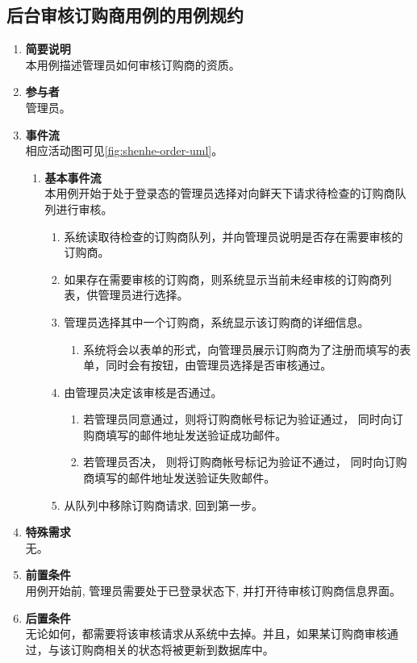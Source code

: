 \subsection{后台审核订购商用例的用例规约}

\begin{enumerate}
	\item \textbf{简要说明}  \\ 本用例描述管理员如何审核订购商的资质。
	\item \textbf{参与者} \\ 管理员。
	\item \textbf{事件流} \\ 相应活动图可见\autoref{fig:shenhe-order-uml}。
	\begin{enumerate} 
        \item \textbf{基本事件流} \\ 本用例开始于处于登录态的管理员选择对向鲜天下请求待检查的订购商队列进行审核。
        \begin{enumerate}
            \item 系统读取待检查的订购商队列，并向管理员说明是否存在需要审核的订购商。
            \item 如果存在需要审核的订购商，则系统显示当前未经审核的订购商列表，供管理员进行选择。
            \item 管理员选择其中一个订购商，系统显示该订购商的详细信息。
            \begin{enumerate}
                \item 系统将会以表单的形式，向管理员展示订购商为了注册而填写的表单，同时会有按钮，由管理员选择是否审核通过。
            \end{enumerate}
            \item 由管理员决定该审核是否通过。
            \begin{enumerate}
                \item 若管理员同意通过，则将订购商帐号标记为验证通过， 同时向订购商填写的邮件地址发送验证成功邮件。
                \item 若管理员否决， 则将订购商帐号标记为验证不通过， 同时向订购商填写的邮件地址发送验证失败邮件。
            \end{enumerate}
            \item 从队列中移除订购商请求, 回到第一步。
        \end{enumerate}
    \end{enumerate}
    \item \textbf{特殊需求} \\ 无。
    \item \textbf{前置条件} \\ 用例开始前, 管理员需要处于已登录状态下, 并打开待审核订购商信息界面。
    \item \textbf{后置条件} \\ 无论如何，都需要将该审核请求从系统中去掉。并且，如果某订购商审核通过，与该订购商相关的状态将被更新到数据库中。
\end{enumerate}



